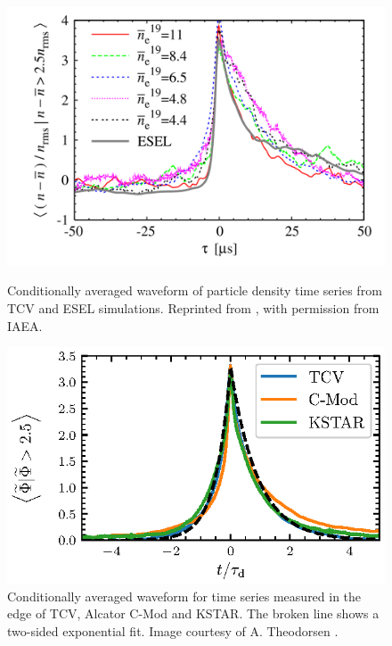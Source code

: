 \begin{figure}
	\centering
	\begin{minipage}{.48\linewidth}
		\includegraphics[width=\linewidth]{figures/garcia2007.png}
		\caption{Conditionally averaged waveform of particle density time series from TCV and ESEL simulations. Reprinted from \cite{garcia2007fluctuations}, with permission from IAEA.}
		\label{Fig:garcia2007}
	\end{minipage}
	\hfill
	\begin{minipage}{.48\linewidth}
		\includegraphics[width=\linewidth]{figures/compare_cav_wf.eps}
		\caption{Conditionally averaged waveform for time series measured in the edge of TCV, Alcator C-Mod and KSTAR. The broken line shows a two-sided exponential fit. Image courtesy of A. Theodorsen \cite{theodorsen2018statistical}.}
		\label{Fig:theodorsen_CA}
	\end{minipage}
\end{figure}

